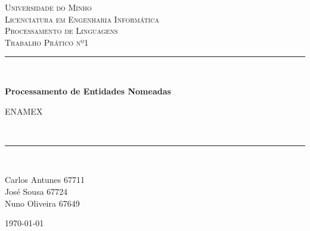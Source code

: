 \documentclass[11pt,a4paper]{article}
\begin{document}
\begin{titlepage}

\newcommand{\HRule}{\rule{\linewidth}{0.5mm}} %

\center %
 

\textsc{\LARGE Universidade do Minho}\\[1.5cm] %
\textsc{\Large Licenciatura em Engenharia Informática}\\[0.5cm] %
\textsc{\large Processamento de Linguagens}\\[0.5cm]
\textsc{\large Trabalho Prático nº1}\\[0.5cm]

\HRule \\[0.4cm]
{ \huge \bfseries Processamento de Entidades Nomeadas \par ENAMEX }\\[0.1cm] %
\HRule \\[1.5cm]
 
\vspace{4cm}
\begin{minipage}{0.4\textwidth}
\begin{center} \large
Carlos Antunes 67711\\
José Sousa 67724\\
Nuno Oliveira 67649\\
\end{center}
\end{minipage}



\vfill
{\large \today}\\[3cm] %


\end{titlepage}
\end{document}
